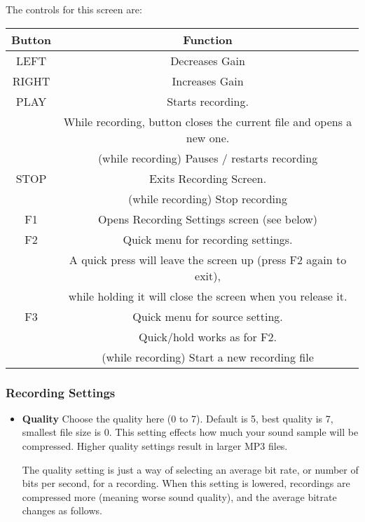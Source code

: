 The controls for this screen are:

\begin{table}[h!]
  \begin{center}
    \begin{tabular}{@{}cc@{}}\toprule
      \textbf{Button} & \textbf{Function} \\\midrule
      LEFT & Decreases Gain \\
      RIGHT & Increases Gain \\
      PLAY & Starts recording.  \\
           & While recording, button closes the current file and opens a new one.\\
           & (while recording) Pauses / restarts recording \\
      STOP & Exits Recording Screen.\\
           & (while recording) Stop recording \\
      F1 & Opens Recording Settings screen (see below) \\
      F2 & Quick menu for recording settings. \\
         & A quick press will leave the screen up (press F2 again to exit),\\
         & while holding it will close the screen when you release it. \\
      F3 & Quick menu for source setting. \\
         & Quick/hold works as for F2. \\
         & (while recording) Start a new recording file \\\bottomrule
    \end{tabular}
  \end{center}
\end{table}

\subsubsection{\label{ref:Recordingsettings}Recording Settings}
\begin{itemize}
\item \textbf{Quality}
Choose the quality here (0 to 7). Default is 5, best quality is 7,
smallest file size is 0.  This setting effects how much your sound
sample will be compressed.  Higher quality settings result in larger
MP3 files.

The quality setting is just a way of selecting an average bit rate, or
number of  bits per second, for a recording.  When  this setting is
lowered, recordings are compressed more (meaning worse sound quality),
and the average bitrate changes as follows.
\end{itemize}

